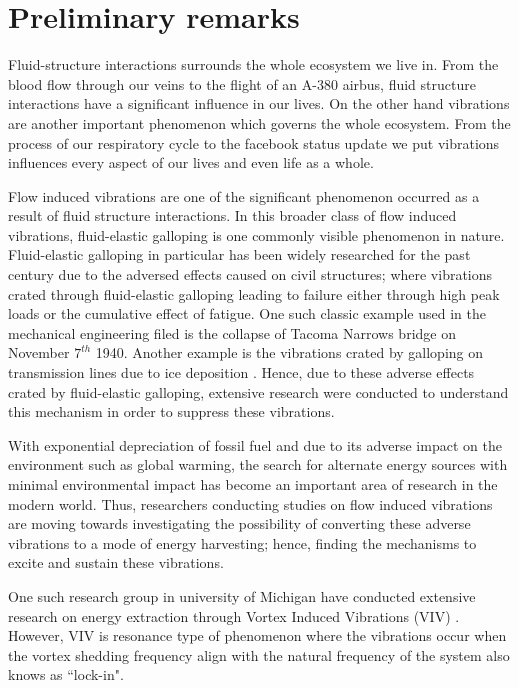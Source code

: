 \chapter{Preliminary remarks}

Fluid-structure interactions surrounds the whole ecosystem we live in. From the blood flow through our veins to the flight of an A-380 airbus, fluid structure interactions have a significant influence in our lives. On the other hand vibrations are another important phenomenon which governs the whole ecosystem. From the process of our respiratory cycle to the facebook status update we put vibrations influences every aspect of our lives and even life as a whole.  


Flow induced vibrations are one of the significant phenomenon occurred as a result of fluid structure interactions. In this broader class of flow induced vibrations, fluid-elastic galloping is one commonly visible phenomenon in nature. Fluid-elastic galloping in particular has been widely researched for the past century due to the adversed effects caused on civil structures; where vibrations crated through fluid-elastic galloping  leading to failure either through high peak loads or the cumulative effect of fatigue. One such classic example used in the mechanical engineering filed is the collapse of Tacoma Narrows bridge on November $7^{th}$ 1940. Another example is the vibrations crated by galloping on transmission lines due to ice deposition \citep{Parkinson1964}. Hence, due to these adverse effects crated by fluid-elastic galloping, extensive research were conducted to understand this mechanism in order to suppress these vibrations.  

With exponential depreciation of  fossil fuel and due to its adverse impact on the environment such as global warming, the search for alternate energy sources with minimal environmental impact has become an important area of research in the modern world. Thus, researchers conducting studies on flow induced vibrations are moving towards investigating the possibility of converting these adverse vibrations to a mode of energy harvesting; hence, finding the mechanisms to excite and sustain these vibrations\citep{Barrero-Gil2010a}.  

One such research group in university of Michigan have conducted extensive research on energy extraction through Vortex Induced Vibrations (VIV) \citep{Bernitsas2008a-concept, Bernitsas2009, Raghavan2010a, Lee2011b}. However, VIV is resonance type of phenomenon where the vibrations occur when the vortex shedding frequency align with the natural frequency of the system also knows as ``lock-in".

